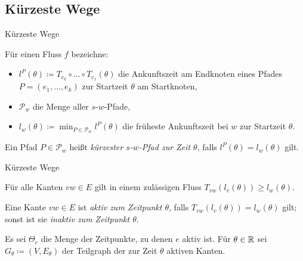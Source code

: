 \subsection{Kürzeste Wege}

\begin{frame}{Kürzeste Wege}
	\begin{definition}
		Für einen Fluss $f$ bezeichne:
		\begin{itemize}[label=\color{darkblue}$\bullet$]
			\item\pause $l^P(\theta)\coloneq T_{e_k}\circ\dots\circ T_{e_1}(\theta)$ die Ankunftszeit am Endknoten eines Pfades $P=(e_1,\dots,e_k)$ zur Startzeit $\theta$ am Startknoten,
			\item\pause $\mathcal{P}_w$ die Menge aller $s$-$w$-Pfade,
			\item\pause $l_w(\theta) \coloneq \min_{P\in\mathcal{P}_w} l^P(\theta)$ die früheste Ankunftszeit bei $w$ zur Startzeit $\theta$.
		\end{itemize}
	\pause Ein Pfad $P\in \mathcal{P}_w$ heißt \emph{kürzester $s$-$w$-Pfad zur Zeit $\theta$}, falls $l^P(\theta)=l_w(\theta)$ gilt.
	\end{definition}
\end{frame}

\begin{frame}{Kürzeste Wege}
	\begin{lemma}[Dreiecksungleichung]
		Für alle Kanten $vw\in E$ gilt in einem zulässigen Fluss $T_{vw}(l_v(\theta))\geq l_w(\theta)$.
	\end{lemma}
	
	\pause\begin{definition}
		Eine Kante $vw\in E$ ist \emph{aktiv zum Zeitpunkt $\theta$}, falls $T_{vw}(l_v(\theta)) = l_w(\theta)$ gilt; sonst ist sie \emph{inaktiv zum Zeitpunkt $\theta$}.
		
		\pause
		Es sei $\Theta_e$ die Menge der Zeitpunkte, zu denen $e$ aktiv ist.
		Für $\theta\in\mathbb{R}$ sei $G_\theta\coloneq (V, E_\theta)$ der Teilgraph der zur Zeit $\theta$ aktiven Kanten.
	\end{definition}
\end{frame}